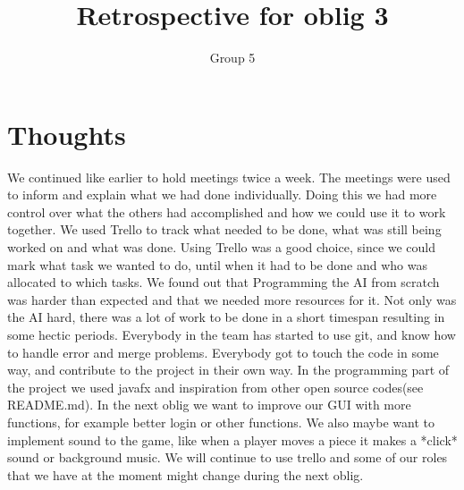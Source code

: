 \documentclass{article}
\title{Retrospective for oblig 3}
\author{Group 5}
\date{}
\begin{document}
    \maketitle

    \section{Thoughts}
    \noindent
     We continued like earlier to hold meetings twice a week. The meetings were used to inform and explain what we had
     done individually. Doing this we had more control over what the others had accomplished and how we could use it to work together.
     We used Trello to track what needed to be done, what was still being worked on and what was done. Using Trello was a good choice, since we could mark what task we
     wanted to do, until when it had to be done and who was allocated to which tasks. We found out that Programming the AI from scratch was harder than expected
     and that we needed more resources for it. Not only was the AI hard, there was a lot of work to be done in a short timespan
     resulting in some hectic periods. Everybody in the team has started to use git, and know how to handle error and merge problems.
     Everybody got to touch the code in some way, and contribute to the project in their own way. In the programming part of the project
     we used javafx and inspiration from other open source codes(see README.md). In the next oblig we want to
     improve our GUI with more functions, for example better login or other functions. We also maybe want to implement sound to the game, like when a player moves a piece it makes a *click* sound or background music. We will continue to use trello and some of our roles that we have at the moment might change during the next oblig. 
\end{document}
